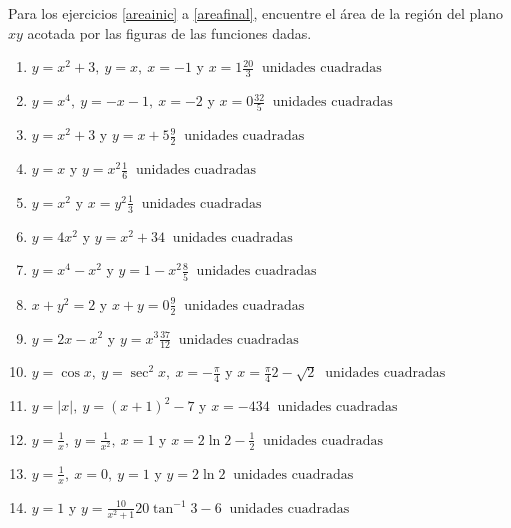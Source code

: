 \begin{ejer}{Para los ejercicios \eqref{areainic} a \eqref{areafinal}, encuentre el área de la región del plano $xy$ acotada por las figuras de las funciones dadas.}
\end{ejer}
{\small
\begin{enumerate}

\label{areainic}
\item {$y=x^{2}+3,\ y=x,\ x=-1$ y $x=1$}{$\frac{20}{3}\ \text{ unidades cuadradas} $}

\item {$y=x^{4},\ y=-x-1,\ x=-2$ y $x=0$}{$\frac{32}{5}\ \text{ unidades cuadradas}$}

\item {$y=x^{2}+3$ y $y=x+5$}{$\frac{9}{2} \ \text{ unidades cuadradas}$}

\item {$y=x$ y $y=x^{2}$}{$\frac{1}{6}\ \text{ unidades cuadradas}$}

\item {$y=x^{2}$ y $ x=y^{2}$}{$\frac{1}{3}\ \text{ unidades cuadradas}$}

\item {$y=4x^{2}$ y $y=x^{2}+3$}{$4 \ \text{ unidades cuadradas}$}

\item {$y=x^{4}-x^{2}$ y $y=1-x^{2}$}{$\frac{8}{5} \ \text{ unidades cuadradas}$}

\item {$x+y^{2}=2$ y $x+y=0$}{$\frac{9}{2} \ \text{ unidades cuadradas}$}

\item {$y=2x-x^{2}$ y $y=x^{3}$}{$\frac{37}{12} \ \text{ unidades cuadradas}$}

\item {$y=\cos x,\ y=\sec ^{2}x,\ x=-\frac{\pi }{4}$ y $x=\frac{\pi}{4}$}{$2-\sqrt{2}\ \text{ unidades cuadradas}$}

\item {$y=\vert x\vert,\ y=(x+1)^{2}-7$ y $x=-4$}{$34\ \text{ unidades cuadradas}$}

\item {$y=\frac{1}{x},\ y=\frac{1}{x^{2}},\ x=1$ y $x=2$}{$\ln 2-\frac{1}{2}\ \text{ unidades cuadradas}$}

\item {$y=\frac{1}{x},\ x=0,\ y=1$ y $y=2$}{$\ln 2\ \text{ unidades cuadradas}$}

\item {$y=1$ y $y=\frac{10}{x^{2}+1}$}{$20\tan^{-1}3-6\ \text{ unidades cuadradas}$}


\end{enumerate}}

